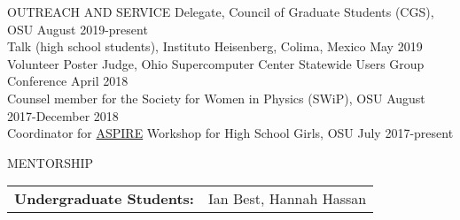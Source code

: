 \documentclass{resume} %
\begin{document}
\begin{rSection}{OUTREACH AND SERVICE}
Delegate, Council of Graduate Students (CGS), OSU \hfill August 2019-present\\
Talk (high school students), Instituto Heisenberg, Colima, Mexico  \hfill May 2019\\
Volunteer Poster Judge, Ohio Supercomputer Center Statewide Users Group Conference \hfill April 2018\\
Counsel member for the Society for Women in Physics (SWiP), OSU \hfill August 2017-December 2018\\
Coordinator for \href{u.osu.edu/aspire}{ASPIRE} Workshop for High School Girls, OSU \hfill July 2017-present\\
\end{rSection}
\vspace{-0.30cm}

\begin{rSection}{MENTORSHIP}
\begin{table}[h]
\begin{tabularx}{\textwidth}{l X}
{\bf Undergraduate Students:}  & Ian Best, Hannah Hassan \\
\end{tabularx}
\end{table}
\end{rSection}
\end{document}
